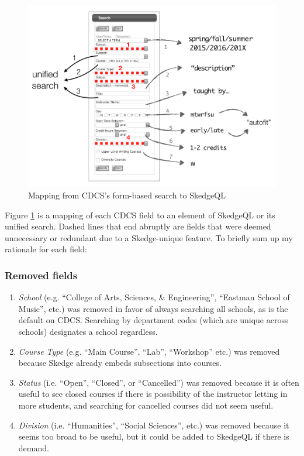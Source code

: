 \begin{figure}[ht]
  \centering
  \vspace{10pt}
  \includegraphics[width=14cm]{images/search-mapping}
  \caption{Mapping from CDCS's form-based search to SkedgeQL} \label{fig:search-mapping}
\end{figure}

Figure \ref{fig:search-mapping} is a mapping of each CDCS field to an element of SkedgeQL or its unified search. Dashed lines that end abruptly are fields that were deemed unnecessary or redundant due to a Skedge-unique feature. To briefly sum up my rationale for each field:

\onehalfspacing

\subsubsection{Removed fields}

\begin{enumerate}

  \item \emph{School} (e.g. ``College of Arts, Sciences, \& Engineering'', ``Eastman School of Music'', etc.) was removed in favor of always searching all schools, as is the default on CDCS. Searching by department codes (which are unique across schools) designates a school regardless.

  \item \emph{Course Type} (e.g. ``Main Course'', ``Lab'', ``Workshop'' etc.) was removed because Skedge already embeds subsections into courses.

  \item \emph{Status} (i.e. ``Open'', ``Closed'', or ``Cancelled'') was removed because it is often useful to see closed courses if there is possibility of the instructor letting in more students, and searching for cancelled courses did not seem useful.

  \item \emph{Division} (i.e. ``Humanities'', ``Social Sciences'', etc.) was removed because it seems too broad to be useful, but it could be added to SkedgeQL if there is demand.

\end{enumerate}

